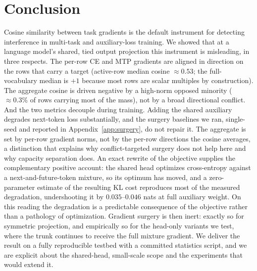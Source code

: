 \section{Conclusion}
\label{sec:conclusion}
Cosine similarity between task gradients is the default instrument for detecting
interference in multi-task and auxiliary-loss training. We showed that at a language model's shared, tied output projection this instrument is misleading, in three respects. The per-row CE and MTP gradients are aligned in direction on the rows that carry a target (active-row median cosine ${\approx}0.53$; the full-vocabulary median is $+1$ because most rows are scalar multiples by construction). The aggregate cosine is driven negative by a high-norm opposed minority ($\approx0.3\%$ of rows carrying most of the mass), not by a broad directional conflict. And the two metrics decouple during training.
Adding the shared auxiliary degrades next-token loss substantially, and the
surgery baselines we ran, single-seed and reported in
Appendix~\ref{app:surgery}, do not repair it. The aggregate is
set by per-row gradient norms, not by the per-row directions the cosine averages,
a distinction that explains why conflict-targeted surgery does not help here and
why capacity separation does. An exact rewrite of the objective supplies the
complementary positive account: the shared head optimizes cross-entropy against a
next-and-future-token mixture, so its optimum has moved, and a zero-parameter estimate of the
resulting KL cost reproduces most of the measured degradation, undershooting it by
$0.035$--$0.046$ nats at full auxiliary weight. On this reading the degradation is a predictable consequence of the objective rather than a pathology of optimization. Gradient surgery is then inert: exactly so for symmetric projection, and empirically so for the head-only variants we test, where the trunk continues to receive the full mixture gradient. We deliver the result
on a fully reproducible testbed with a committed statistics script, and we are
explicit about the shared-head, small-scale scope and the experiments that would
extend it.
